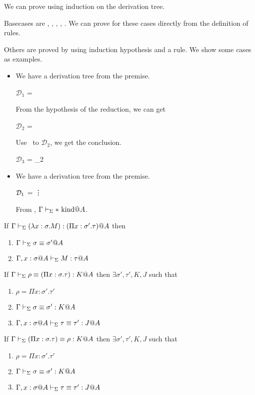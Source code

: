 We can prove using induction on the derivation tree.

Basecases are \KVar, \TVar, \QKRefl, \QTRefl, \QRefl.
We can prove for these cases directly from the definition of rules.

Others are proved by using induction hypothesis and a rule. We show some cases as examples.
\begin{itemize}
	\item \KCsp
	      	      
	      We have a derivation tree from the premise.
	      	      
	      $\mathcal{D}_1$ = 
	      {}
	      	      
	      From the hypothesis of the reduction, we can get
	      	      
	      $\mathcal{D}_2$ = 
	      	      
	      Use \WCsp\ to $\mathcal{D}_2$, we get the conclusion.
	      	      
	      $\mathcal{D}_3$ = 
	      {_2}
	      	      
	\item \KTW
	      	      
	      We have a derivation tree from the premise.
	      	      
	      $\mathcal{D}_1$ = 
	      {\vdots}
	      	      
	      From \WStar, $\Gamma\vdash_\Sigma * \text{\ kind} @A$.
	      	      
\end{itemize}

\begin{lemma}
	If $\Gamma \vdash_\Sigma (\lambda x:\sigma.M) : (\Pi x:\sigma'.\tau)@A$ then
	\begin{enumerate}
		\item $\Gamma \vdash_\Sigma \sigma \equiv \sigma'@A$
		\item $\G ,x:\sigma@A\V M:\tau@A$
	\end{enumerate}
	\item If $\Gamma \vdash_\Sigma \rho \equiv (\Pi x:\sigma.\tau) : K @A$ then $\exists \sigma', \tau', K, J$ such that
	\begin{enumerate}
		\item $\rho = \Pi x:\sigma'.\tau'$
		\item $\Gamma \vdash_\Sigma \sigma \equiv \sigma' : K @A$
		\item $\G, x:\sigma@A\V \tau \E \tau' : J @A$
	\end{enumerate}
	\item If $\Gamma \vdash_\Sigma (\Pi x:\sigma.\tau) \equiv \rho : K @A$ then $\exists \sigma', \tau', K, J$ such that
	\begin{enumerate}
		\item $\rho = \Pi x:\sigma'.\tau'$
		\item $\Gamma \vdash_\Sigma \sigma \equiv \sigma' : K @A$
		\item $\G, x:\sigma@A\V \tau \E \tau' : J @A$
	\end{enumerate}
\end{lemma}

